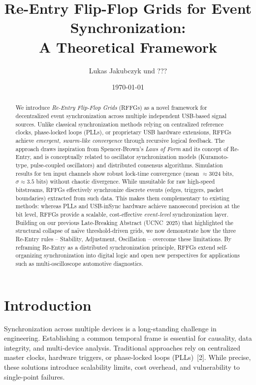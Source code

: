 \documentclass[11pt]{article}
\title{Re-Entry Flip-Flop Grids for Event Synchronization:\\
A Theoretical Framework}
\author{Lukas Jakubczyk und ???}
\date{\today}
\begin{document}
\maketitle

\begin{abstract}
We introduce \textit{Re-Entry Flip-Flop Grids} (RFFGs) as a novel framework for decentralized event synchronization across multiple independent USB-based signal sources. Unlike classical synchronization methods relying on centralized reference clocks, phase-locked loops (PLLs), or proprietary USB hardware extensions, RFFGs achieve \textit{emergent, swarm-like convergence} through recursive logical feedback. The approach draws inspiration from Spencer-Brown’s \textit{Laws of Form} and its concept of Re-Entry, and is conceptually related to oscillator synchronization models (Kuramoto-type, pulse-coupled oscillators) and distributed consensus algorithms.
Simulation results for ten input channels show robust lock-time convergence (mean $\approx$3024 bits, $\sigma \approx 3.5$ bits) without chaotic divergence. While unsuitable for raw high-speed bitstreams, RFFGs effectively synchronize discrete events (edges, triggers, packet boundaries) extracted from such data. This makes them complementary to existing methods: whereas PLLs and USB-inSync hardware achieve nanosecond precision at the bit level, RFFGs provide a scalable, cost-effective \textit{event-level} synchronization layer.
Building on our previous Late-Breaking Abstract (UCNC~2025) that highlighted the structural collapse of naïve threshold-driven grids, we now demonstrate how the three Re-Entry rules -- Stability, Adjustment, Oscillation -- overcome these limitations. By reframing Re-Entry as a distributed synchronization principle, RFFGs extend self-organizing synchronization into digital logic and open new perspectives for applications such as multi-oscilloscope automotive diagnostics.
\end{abstract}

\section{Introduction}
Synchronization across multiple devices is a long-standing challenge in engineering. Establishing a common temporal frame is essential for causality, data integrity, and multi-device analysis. Traditional approaches rely on centralized master clocks, hardware triggers, or phase-locked loops (PLLs)~[2]. While precise, these solutions introduce scalability limits, cost overhead, and vulnerability to single-point failures.
\end{document}
